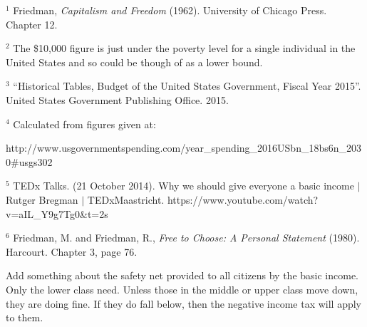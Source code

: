 \documentclass[12pt]{article}
\begin{document}
\begin{footnotesize}
\noindent $^1$ Friedman, \emph{Capitalism and Freedom} (1962). University of Chicago Press. Chapter 12.
\smallskip

\noindent $^2$ The \$10,000 figure is just under the poverty level for a single individual in the United States and so could be though of as a lower bound.

\smallskip

\noindent $^3$ ``Historical Tables, Budget of the United States Government, Fiscal Year 2015''. United States Government Publishing Office. 2015.
\smallskip


\noindent $^4$ Calculated from figures given at:

\noindent http://www.usgovernmentspending.com/year\_spending\_2016USbn\_18bs6n\_2030\#usgs302
\smallskip

\noindent $^5$ TEDx Talks. (21 October 2014). Why we should give everyone a basic income $|$ Rutger Bregman $|$ TEDxMaastricht. https://www.youtube.com/watch?v=aIL\_Y9g7Tg0\&t=2s
\smallskip

\noindent $^6$ Friedman, M. and Friedman, R., \emph{Free to Choose: A Personal Statement} (1980). Harcourt. Chapter 3, page 76.

\end{footnotesize}




Add something about the safety net provided to all citizens by the basic income. Only the lower class need. Unless those in the middle or upper class move down, they are doing fine. If they do fall below, then the negative income tax will apply to them.
\end{document}
